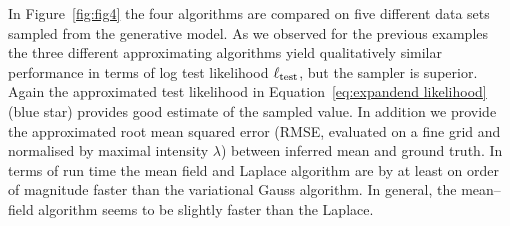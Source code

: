 \documentclass[twoside,11pt]{article}
\begin{document}
In Figure~\ref{fig:fig4} the four algorithms are compared on five different data sets sampled from the generative model. As we observed for the previous examples the three different approximating algorithms yield qualitatively similar performance in terms of log test likelihood $\ell_{\rm test}$, but the sampler is superior. Again the approximated test likelihood in Equation~\eqref{eq:expandend likelihood} (blue star) provides good estimate of the sampled value. In addition we provide the approximated root mean squared error (RMSE, evaluated on a fine grid and normalised by maximal intensity $\lambda$) between inferred mean and ground truth. In terms of run time the mean field and Laplace algorithm are by at least on order of magnitude faster than the variational Gauss algorithm. In general, the mean--field algorithm seems to be slightly faster than the Laplace.
\end{document}
